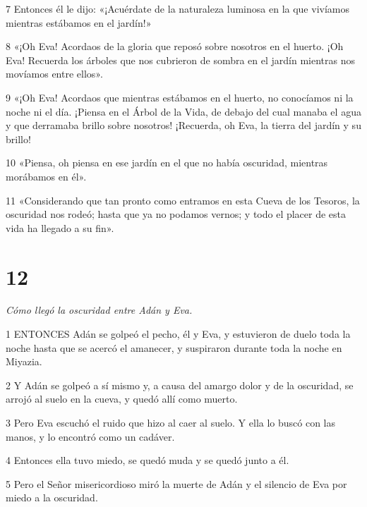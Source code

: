 \par 7 Entonces él le dijo: «¡Acuérdate de la naturaleza luminosa en la que vivíamos mientras estábamos en el jardín!»

\par 8 «¡Oh Eva! Acordaos de la gloria que reposó sobre nosotros en el huerto. ¡Oh Eva! Recuerda los árboles que nos cubrieron de sombra en el jardín mientras nos movíamos entre ellos».

\par 9 «¡Oh Eva! Acordaos que mientras estábamos en el huerto, no conocíamos ni la noche ni el día. ¡Piensa en el Árbol de la Vida, de debajo del cual manaba el agua y que derramaba brillo sobre nosotros! ¡Recuerda, oh Eva, la tierra del jardín y su brillo!

\par 10 «Piensa, oh piensa en ese jardín en el que no había oscuridad, mientras morábamos en él».

\par 11 «Considerando que tan pronto como entramos en esta Cueva de los Tesoros, la oscuridad nos rodeó; hasta que ya no podamos vernos; y todo el placer de esta vida ha llegado a su fin».

\chapter{12}

\par \textit{Cómo llegó la oscuridad entre Adán y Eva.}

\par 1 ENTONCES Adán se golpeó el pecho, él y Eva, y estuvieron de duelo toda la noche hasta que se acercó el amanecer, y suspiraron durante toda la noche en Miyazia.

\par 2 Y Adán se golpeó a sí mismo y, a causa del amargo dolor y de la oscuridad, se arrojó al suelo en la cueva, y quedó allí como muerto.

\par 3 Pero Eva escuchó el ruido que hizo al caer al suelo. Y ella lo buscó con las manos, y lo encontró como un cadáver.

\par 4 Entonces ella tuvo miedo, se quedó muda y se quedó junto a él.

\par 5 Pero el Señor misericordioso miró la muerte de Adán y el silencio de Eva por miedo a la oscuridad.


